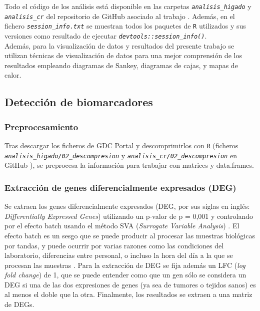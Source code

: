 Todo el código de los análisis está disponible en las carpetas \textit{\texttt{analisis\_higado}} y \textit{\texttt{analisis\_cr}} del repositorio de GitHub asociado al trabajo \cite{Redondo-Sanchez2020}. Además, en el fichero \textit{\texttt{session\_info.txt}} se muestran todos los paquetes de \texttt{R} utilizados y sus versiones como resultado de ejecutar \textit{\texttt{devtools::session\_info()}}.\\

Además, para la visualización de datos y resultados del presente trabajo se utilizan técnicas de visualización de datos para una mejor comprensión de los resultados empleando diagramas de Sankey, diagramas de cajas, y mapas de calor.

\subsection{Detección de biomarcadores}

\subsubsection{Preprocesamiento}

Tras descargar los ficheros de GDC Portal y descomprimirlos con \texttt{R} (ficheros \textit{\texttt{analisis\_higado/02\_descompresion}} y \textit{\texttt{analisis\_cr/02\_descompresion}}  en GitHub \cite{Redondo-Sanchez2020}), se preprocesa la información para trabajar con matrices y data.frames.

\subsubsection{Extracción de genes diferencialmente expresados (DEG)}

Se extraen los genes diferencialmente expresados (DEG, por sus siglas en inglés: \textit{Differentially Expressed Genes}) utilizando un p-valor de p = 0,001 y controlando por el efecto batch usando el método SVA (\textit{Surrogate Variable Analysis}) \cite{Leek2012}. El efecto batch es un sesgo que se puede producir al procesar las muestras biológicas por tandas, y puede ocurrir por varias razones como las condiciones del laboratorio, diferencias entre personal, o incluso la hora del día a la que se procesan las muestras \cite{Goh2017, Leek2010}. Para la extracción de DEG se fija además un LFC (\textit{log fold change}) de 1, que se puede entender como que un gen sólo se considera un DEG si una de las dos expresiones de genes (ya sea de tumores o tejidos sanos) es al menos el doble que la otra. Finalmente, los resultados se extraen a una matriz de DEGs.\\


